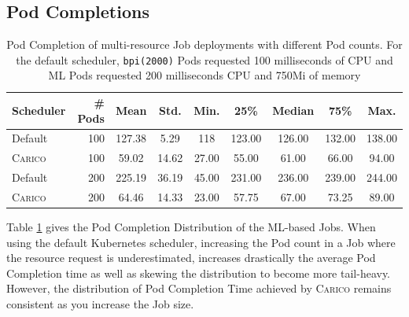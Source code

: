 \subsection{Pod Completions}
\begin{table}[ht!]
\centering
    \begin{tabular}{|l|r|c|c|c|c|c|c|c|}
    \hline
        \bfseries Scheduler & \bfseries \# Pods & \bfseries Mean & \bfseries Std. &
        \bfseries Min. & \bfseries 25\% & \bfseries Median & \bfseries 75\% & \bfseries Max. \\
    \hline
        Default & 100 & 127.38 & 5.29 & 118 & 123.00 & 126.00 & 132.00 &
        138.00 \\
        \textsc{Carico} & 100 & 59.02 & 14.62 & 27.00 & 55.00 & 61.00 & 66.00 & 94.00 \\
        Default & 200 & 225.19 & 36.19 & 45.00 & 231.00 & 236.00 & 239.00 &
        244.00\\
        \textsc{Carico} & 200 & 64.46 & 14.33 & 23.00 & 57.75 & 67.00 & 73.25 & 89.00 \\
    \hline
    \end{tabular}
    \caption{Pod Completion of multi-resource Job deployments with different Pod
    counts. For the default scheduler, \texttt{bpi(2000)} Pods requested 100
    milliseconds of CPU and ML Pods requested 200 milliseconds CPU and 750Mi of
    memory}
    \label{tab:mem-pod-completions}
\end{table}

Table \ref{tab:mem-pod-completions} gives the Pod Completion Distribution of the
ML-based Jobs. When using the default Kubernetes scheduler, increasing the Pod
count in a Job where the resource request is underestimated, increases
drastically the average Pod Completion time as well as skewing the distribution
to become more tail-heavy. However, the distribution of Pod Completion Time
achieved by \textsc{Carico} remains consistent as you increase the Job size.

